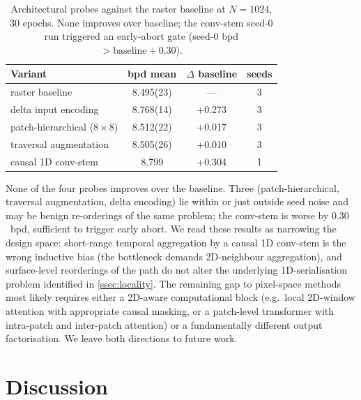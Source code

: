 \documentclass[conference]{IEEEtran}
\begin{document}
\begin{table}[t]
\centering
\caption{Architectural probes against the raster baseline at
  $N{=}1024$, 30 epochs. None improves over baseline; the
  conv-stem seed-0 run triggered an early-abort gate
  (seed-0 bpd $> \text{baseline} + 0.30$).}
\label{tab:probes}
\begin{tabular}{l S[table-format=1.3(3)] S[table-format=+1.3]
                S[table-format=1]}
\toprule
Variant & {bpd mean} & {$\Delta$ baseline} & {seeds} \\
\midrule
raster baseline                   & 8.495(23) & {---}  & 3 \\
delta input encoding              & 8.768(14) & +0.273 & 3 \\
patch-hierarchical ($8{\times}8$) & 8.512(22) & +0.017 & 3 \\
traversal augmentation            & 8.505(26) & +0.010 & 3 \\
causal 1D conv-stem               & {8.799}   & +0.304 & 1 \\
\bottomrule
\end{tabular}
\end{table}

None of the four probes improves over the baseline. Three
(patch-hierarchical, traversal augmentation, delta encoding) lie
within or just outside seed noise and may be benign re-orderings
of the same problem; the conv-stem is worse by $0.30$~bpd,
sufficient to trigger early abort. We read these results as
narrowing the design space: short-range temporal aggregation by a
causal 1D conv-stem is the wrong inductive bias (the bottleneck
demands 2D-neighbour aggregation), and surface-level reorderings
of the path do not alter the underlying 1D-serialisation problem
identified in \cref{ssec:locality}. The remaining gap to
pixel-space methods most likely requires either a 2D-aware
computational block (e.g.\ local 2D-window attention with
appropriate causal masking, or a patch-level transformer with
intra-patch and inter-patch attention) or a fundamentally
different output factorisation. We leave both directions to
future work.

\section{Discussion}\label{sec:discussion}
\end{document}
